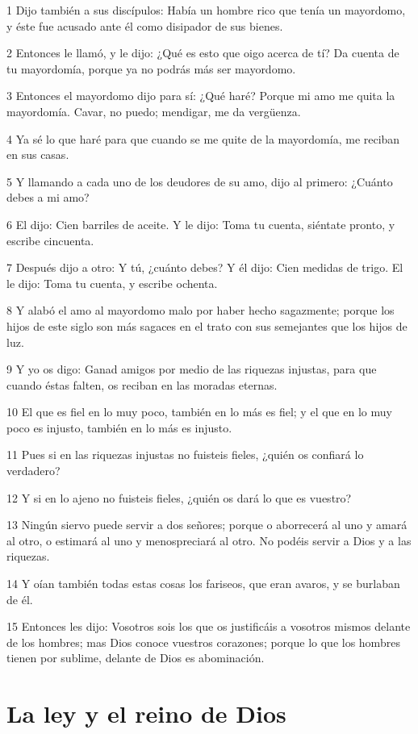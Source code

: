 \par 1 Dijo también a sus discípulos: Había un hombre rico que tenía un mayordomo, y éste fue acusado ante él como disipador de sus bienes.
\par 2 Entonces le llamó, y le dijo: ¿Qué es esto que oigo acerca de tí? Da cuenta de tu mayordomía, porque ya no podrás más ser mayordomo.
\par 3 Entonces el mayordomo dijo para sí: ¿Qué haré? Porque mi amo me quita la mayordomía. Cavar, no puedo; mendigar, me da vergüenza.
\par 4 Ya sé lo que haré para que cuando se me quite de la mayordomía, me reciban en sus casas.
\par 5 Y llamando a cada uno de los deudores de su amo, dijo al primero: ¿Cuánto debes a mi amo?
\par 6 El dijo: Cien barriles de aceite. Y le dijo: Toma tu cuenta, siéntate pronto, y escribe cincuenta.
\par 7 Después dijo a otro: Y tú, ¿cuánto debes? Y él dijo: Cien medidas de trigo. El le dijo: Toma tu cuenta, y escribe ochenta.
\par 8 Y alabó el amo al mayordomo malo por haber hecho sagazmente; porque los hijos de este siglo son más sagaces en el trato con sus semejantes que los hijos de luz.
\par 9 Y yo os digo: Ganad amigos por medio de las riquezas injustas, para que cuando éstas falten, os reciban en las moradas eternas.
\par 10 El que es fiel en lo muy poco, también en lo más es fiel; y el que en lo muy poco es injusto, también en lo más es injusto.
\par 11 Pues si en las riquezas injustas no fuisteis fieles, ¿quién os confiará lo verdadero?
\par 12 Y si en lo ajeno no fuisteis fieles, ¿quién os dará lo que es vuestro?
\par 13 Ningún siervo puede servir a dos señores; porque o aborrecerá al uno y amará al otro, o estimará al uno y menospreciará al otro. No podéis servir a Dios y a las riquezas.
\par 14 Y oían también todas estas cosas los fariseos, que eran avaros, y se burlaban de él.
\par 15 Entonces les dijo: Vosotros sois los que os justificáis a vosotros mismos delante de los hombres; mas Dios conoce vuestros corazones; porque lo que los hombres tienen por sublime, delante de Dios es abominación.

\section*{La ley y el reino de Dios}

